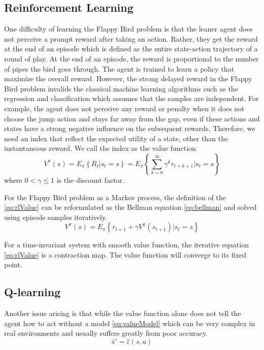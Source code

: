 \documentclass[conference,compsoc]{IEEEtran}
\begin{document}
\subsection{Reinforcement Learning}
One difficulty of learning the Flappy Bird problem is that the leaner agent does not perceive a prompt reward after taking an action. Rather, they get the reward at the end of an episode which is defined as the entire state-action trajectory of a round of play. At the end of an episode, the reward is proportional to the number of pipes the bird goes through. The agent is trained to learn a policy that maximize the overall reward. 
However, the strong delayed reward in the Flappy Bird problem invalids the classical machine learning algorithms such as the regression and classification which assumes that the samples are independent. For example, the agent does not perceive any reward or penalty when it does not choose the jump action and stays far away from the gap, even if these actions and states have a strong negative influence on the subsequent rewards. Therefore, we need an index that reflect the expected utility of a state, other than the instantaneous reward. We call the index as the value function
\begin{equation}\label{eq:rlValue}
V^{\pi}(s)
= E_{\pi} \left\{ R_t | s_t =s \right\}
= E_{\pi} \left\{ \sum_{k=0}^{\infty} \gamma^k r_{t+k+1} | s_t =s \right\}
\end{equation}
where $0<\gamma\leq 1$ is the discount factor. 
 
For the Flappy Bird problem as a Markov process, the definition of the \eqref{eq:rlValue} can be reformulated as the Bellman equation \eqref{eq:bellman} and solved using episode samples iteratively. 
\begin{equation}\label{eq:bellman}
V^{\pi}(s)
= E_{\pi} \left\{ r_{t+1}+\gamma V^{\pi}(s_{t+1}) | s_t =s \right\}
\end{equation}

For a time-invariant system with smooth value function, the iterative equation \eqref{eq:rlValue} is a contraction map. The value function will converge to its fixed point. 

\subsection{Q-learning}
Another issue arising is that while the value function alone does not tell the agent how to act without a model \eqref{eq:valueModel} which can be very complex in real environments and usually suffers greatly from poor accuracy. ~\cite{strehl2006pac}
\begin{equation}\label{eq:valueModel}
\hat{s}' = \hat{\varepsilon} (s,a)
\end{equation}
\end{document}
